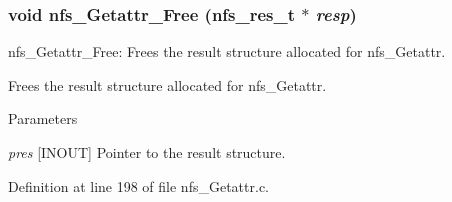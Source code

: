 \subsubsection[{nfs\_\-Getattr\_\-Free}]{\setlength{\rightskip}{0pt plus 5cm}void nfs\_\-Getattr\_\-Free (nfs\_\-res\_\-t $\ast$ {\em resp})}\label{nfs__Getattr_8c_a3faa8c359341697ec064df525e047beb}
nfs\_\-Getattr\_\-Free: Frees the result structure allocated for nfs\_\-Getattr.

Frees the result structure allocated for nfs\_\-Getattr.


\begin{DoxyParams}{Parameters}
\item[{\em pres}][INOUT] Pointer to the result structure. \end{DoxyParams}


Definition at line 198 of file nfs\_\-Getattr.c.